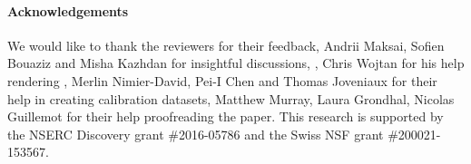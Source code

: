 \paragraph{Acknowledgements}
\begin{draft}
We would like to thank the reviewers for their feedback, Andrii Maksai, Sofien Bouaziz and Misha Kazhdan for insightful discussions, , Chris Wojtan for his help rendering , Merlin Nimier-David, Pei-I Chen and Thomas Joveniaux for their help in creating calibration datasets, Matthew Murray, Laura Grondhal, Nicolas Guillemot for their help proofreading the paper. 
% 
This research is supported by the NSERC Discovery grant \#2016-05786 and the Swiss NSF grant \#200021-153567.
\end{draft}